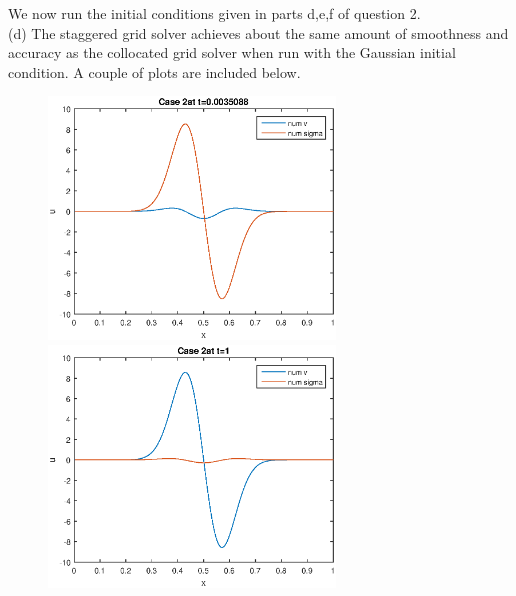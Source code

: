 We now run the initial conditions given in parts d,e,f of question 2.\\

(d) The staggered grid solver achieves about the same amount of smoothness and accuracy as the collocated grid solver when run with the Gaussian initial condition. A couple of plots are included below.
\begin{figure}[h]
\centering
\includegraphics[width=3in]{initStag2}
\includegraphics[width=3in]{endStag2}
\end{figure}

